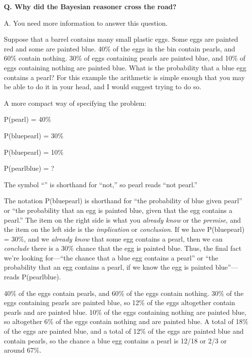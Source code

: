 {
 \textbf{Q. Why did the Bayesian reasoner cross the road?}}

{
 A. You need more information to answer this question.}

{
 Suppose that a barrel contains many small plastic eggs. Some eggs
are painted red and some are painted blue. 40\% of the eggs in the bin
contain pearls, and 60\% contain nothing. 30\% of eggs containing
pearls are painted blue, and 10\% of eggs containing nothing are
painted blue. What is the probability that a blue egg contains a pearl?
For this example the arithmetic is simple enough that you may be able
to do it in your head, and I would suggest trying to do so.}

{
 A more compact way of specifying the problem:}

{\centering
 P(pearl) = 40\%
\par}


\bigskip

{\centering
 P(blue{\textbar}pearl) = 30\%
\par}


\bigskip

{\centering
 P(blue{\textbar}{\textlnot}pearl) = 10\%
\par}


\bigskip

{\centering
 P(pearl{\textbar}blue) = ?
\par}


\bigskip

{
 The symbol ``{\textlnot}'' is
shorthand for ``not,'' so
{\textlnot}pearl reads ``not
pearl.''}

{
 The notation P(blue{\textbar}pearl) is shorthand for
``the probability of blue given
pearl'' or ``the probability that an
egg is painted blue, given that the egg contains a
pearl.'' The item on the right side is what you
\textit{already know} or the \textit{premise}, and the item on the left
side is the \textit{implication} or \textit{conclusion}. If we have
P(blue{\textbar}pearl) = 30\%, and we \textit{already know} that some
egg contains a pearl, then we can \textit{conclude} there is a 30\%
chance that the egg is painted blue. Thus, the final fact
we're looking for---``the chance that
a blue egg contains a pearl'' or
``the probability that an egg contains a pearl, if we
know the egg is painted blue''---reads
P(pearl{\textbar}blue).}

{
 40\% of the eggs contain pearls, and 60\% of the eggs contain
nothing. 30\% of the eggs containing pearls are painted blue, so 12\%
of the eggs altogether contain pearls and are painted blue. 10\% of the
eggs containing nothing are painted blue, so altogether 6\% of the eggs
contain nothing and are painted blue. A total of 18\% of the eggs are
painted blue, and a total of 12\% of the eggs are painted blue and
contain pearls, so the chance a blue egg contains a pearl is 12/18 or
2/3 or around 67\%.}

